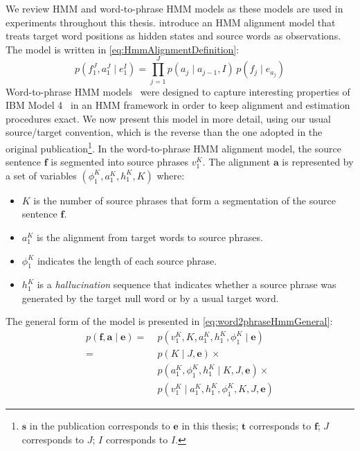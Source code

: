 We review HMM and word-to-phrase HMM models as these models are used
in experiments throughout this thesis.
\citet{vogel-ney-tillmann} introduce an HMM alignment model
that treats target word positions as hidden states and source words as
observations. The model is written in \eqref{eq:HmmAlignmentDefinition}:
%
\begin{equation}
  p(f_1^J, a_1^J \mid e_1^I) = \prod_{j=1}^J p(a_j \mid a_{j-1},I) \, p(f_j \mid e_{a_j})
  \label{eq:HmmAlignmentDefinition}
\end{equation}
%
Word-to-phrase HMM models~\citep{deng-and-byrne:2008:ASLP} were designed to
capture interesting properties of IBM Model
4~\citep{brown-dellapietra-dellapietra-mercer-1993} in an HMM framework in order
to keep alignment and estimation procedures exact. We now present this model
in more detail, using our usual source/target convention, which is the reverse
than the one adopted in the original
publication\footnote{$\bm{s}$ in the publication corresponds to $\bm{e}$ in this thesis;
$\bm{t}$ corresponds to $\bm{f}$; $J$ corresponds to $J$; $I$ corresponds to $I$.}.
In the word-to-phrase HMM alignment model, the source sentence
$\bm{f}$ is segmented into source phrases $v_1^K$.
The alignment $\bm{a}$ is represented by a set of variables
$(\phi_1^K, a_1^K, h_1^K, K)$ where:
%
\begin{itemize}
  \item $K$ is the number of source phrases that form a segmentation of the source sentence $\bm{f}$.
  \item $a_1^K$ is the alignment from target words to source phrases.
  \item $\phi_1^K$ indicates the length of each source phrase.
  \item $h_1^K$ is a \emph{hallucination} sequence that indicates whether
    a source phrase was generated by the target null word
    or by a usual target word.
\end{itemize}
%
The general form of the model is presented in \autoref{eq:word2phraseHmmGeneral}:
%
\begin{equation}
  \begin{split}
  p(\bm{f}, \bm{a} \mid \bm{e}) = & \; p(v_1^K, K, a_1^K, h_1^K, \phi_1^K \mid \bm{e}) \\
                                = & \; p(K \mid J, \bm{e}) \times \\
                                & \; p(a_1^K, \phi_1^K, h_1^K \mid K, J, \bm{e}) \times \\
                                & \; p(v_1^K \mid a_1^K, h_1^K, \phi_1^K, K, J, \bm{e})
  \end{split}
  \label{eq:word2phraseHmmGeneral}
\end{equation}

